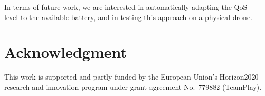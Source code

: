 \documentclass[conference]{IEEEtran}
\begin{document}

In terms of future work, we are interested in automatically adapting
the QoS level to the available battery, and in testing this approach
on a physical drone.

\section*{Acknowledgment}

This work is supported and partly funded by the European Union’s
Horizon2020 research and innovation program under grant agreement
No.~779882 (TeamPlay).


 
\vspace{1ex}
\end{document}
